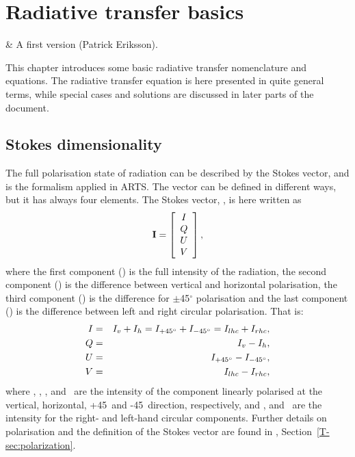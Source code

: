 \chapter{Radiative transfer basics}
 \label{sec:rte_basics}

 & A first version (Patrick Eriksson).\\
\stophistory

This chapter introduces some basic radiative transfer nomenclature and
equations. The radiative transfer equation is here presented in quite general
terms, while special cases and solutions are discussed in later parts of the
document.



\section{Stokes dimensionality}
\label{sec:fm_defs:polarisation}

The full polarisation state of radiation can be described by the Stokes vector,
and is the formalism applied in ARTS. The vector can be defined in different
ways, but it has always four elements. The Stokes vector, \StoVec, is here
written as
\begin{equation}
  \label{eq:fm_defs:stokevec}
  {\bf I} = \left[
  \begin{array}{c}
   I\\ Q \\ U\\ V
  \end{array}
  \right],
\end{equation}
where the first component (\StoI) is the full intensity of the
radiation, the second component (\StoQ) is the difference between
vertical and horizontal polarisation, the third component (\StoU) is the
difference for $\pm$45$^\circ$ polarisation and the last component
(\StoV) is the difference between left and right circular polarisation.
That is:
\begin{eqnarray}
  I &=&   I_v + I_h = I_{+45^\circ} + I_{-45^\circ} = I_{lhc} + I_{rhc}, \\
  Q &=&   I_v - I_h,                                 \\
  U &=&   I_{+45^\circ} - I_{-45^\circ},                             \\
  V &=&   I_{lhc} - I_{rhc},                             
\end{eqnarray}
where \Iv, \Ih, \Ipff, and \Imff\ are the intensity of the component linearly
polarised at the vertical, horizontal, +45\degree\ and -45\degree\ direction,
respectively, and \Irhc, and \Ilhc\ are the intensity for the right- and
left-hand circular components. Further details on polarisation and the
definition of the Stokes vector are found in \theory,
Section~\ref{T-sec:polarization}.

